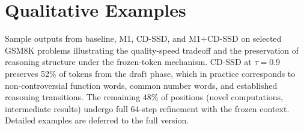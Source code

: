 \documentclass{article}
\begin{document}
\section{Qualitative Examples}
\label{appendix:examples}

Sample outputs from baseline, M1, CD-SSD, and M1+CD-SSD on selected GSM8K problems illustrating
the quality-speed tradeoff and the preservation of reasoning structure under the frozen-token
mechanism. CD-SSD at $\tau = 0.9$ preserves 52\% of tokens from the draft phase, which in practice
corresponds to non-controversial function words, common number words, and established reasoning
transitions. The remaining 48\% of positions (novel computations, intermediate results) undergo full
64-step refinement with the frozen context. Detailed examples are deferred to the full version.
\end{document}
